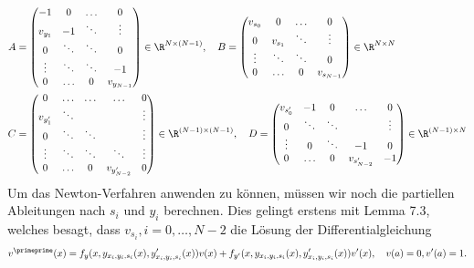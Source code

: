 \begin{solution}
\begin{align*}
    A &= \begin{pmatrix}
    -1 & 0 & \hdots & 0\\
      v_{y_1} & -1 & \ddots & \vdots\\
      0 & \ddots & \ddots & 0\\
      \vdots & \ddots & \ddots & -1\\
      0 & \hdots & 0 & v_{y_{N-1}}\\
  \end{pmatrix} \in \R^{N \times (N-1)}, \quad
  B = \begin{pmatrix}
  v_{s_0} & 0 & \hdots & 0 \\
   0 & v_{s_1} & \ddots & \vdots\\
   \vdots & \ddots & \ddots & 0 \\
   0 & \hdots & 0 & v_{s_{N-1}}\\
\end{pmatrix} \in \R^{N \times N} \\
C &= \begin{pmatrix}
 0 &\hdots & \hdots & \hdots & 0\\
 v_{y^{\prime}_1} & \ddots & & & \vdots\\
 0 & \ddots &  \ddots& & \vdots \\
 \vdots & \ddots & \ddots &  \ddots & \vdots\\
 0 & \hdots & 0 & v_{y^{\prime}_{N-2}} & 0 \\
\end{pmatrix} \in \R^{(N-1)\times(N-1)}, \quad
D = \begin{pmatrix}
  v_{s^{\prime}_0} & -1 & 0 & \hdots & 0\\
  0 & \ddots & \ddots  & & \vdots \\
  \vdots & 0 & \ddots & -1 & 0\\
  0 & \hdots & 0 & v_{s^{\prime}_{N-2}} & -1\\
\end{pmatrix} \in \R^{(N-1)\times N}
  \end{align*}
Um das Newton-Verfahren anwenden zu können, müssen wir noch die partiellen
Ableitungen nach $s_i$ und $y_i$ berechnen. Dies gelingt erstens mit Lemma 7.3, welches
besagt, dass $v_{s_i}, i = 0,\dots,N-2$ die Lösung der Differentialgleichung
\begin{align*}
  v^{\primeprime}(x) = f_y(x,y_{x_i,y_i,s_i}(x),y_{x_i,y_i,s_i}^{\prime}(x))v(x)
  + f_{y^{\prime}}(x,y_{x_i,y_i,s_i}(x),y_{x_i,y_i,s_i}^{\prime}(x))v^{\prime}(x), \quad v(a) = 0, v^{\prime}(a) = 1.
\end{align*}

\end{solution}
